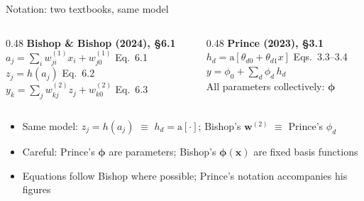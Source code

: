 \documentclass[aspectratio=169, 11pt]{beamer}
\newcommand{\nosrc}{}       %
\begin{document}
\begin{frame}{Notation: two textbooks, same model}
  \nosrc
  \vspace{0.15em}
  {\small
  \begin{columns}[T, onlytextwidth]
    \begin{column}{0.48\textwidth}
      \textbf{Bishop \& Bishop (2024), \S6.1}\\[0.2em]
      $a_j = \sum_{i} w_{ji}^{(1)} x_i + w_{j0}^{(1)}$
      \hfill{\scriptsize Eq.~6.1}\\[0.15em]
      $z_j = h(a_j)$
      \hfill{\scriptsize Eq.~6.2}\\[0.15em]
      $y_k = \sum_{j} w_{kj}^{(2)} z_j + w_{k0}^{(2)}$
      \hfill{\scriptsize Eq.~6.3}
    \end{column}
    \begin{column}{0.48\textwidth}
      \textbf{Prince (2023), \S3.1}\\[0.2em]
      $h_d = \mathrm{a}[\theta_{d0}+\theta_{d1}x]$
      \hfill{\scriptsize Eqs.~3.3--3.4}\\[0.15em]
      $y = \phi_0 + \sum_{d}\phi_d\,h_d$\\[0.15em]
      All parameters collectively: $\bm\phi$
    \end{column}
  \end{columns}}
  \vspace{0.3em}
  \begin{itemize}
    \item Same model: $z_j\!=\!h(a_j)$ $\equiv$
          $h_d\!=\!\mathrm{a}[\cdot]$; \;
          Bishop's $\mathbf{w}^{(2)}$ $\equiv$ Prince's
          $\phi_d$
    \item Careful: Prince's $\bm\phi$ are \alert{parameters};
          Bishop's $\boldsymbol\phi(\mathbf{x})$ are
          \alert{fixed basis functions}
    \item Equations follow Bishop where possible; Prince's
          notation accompanies his figures
  \end{itemize}
\end{frame}
\end{document}
